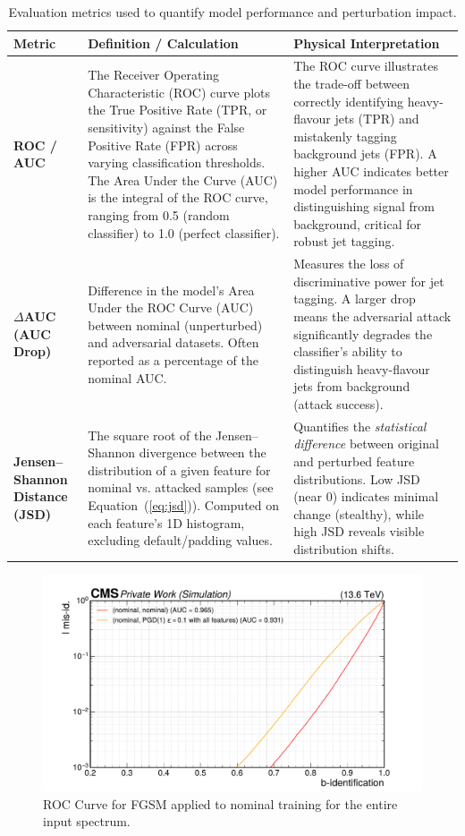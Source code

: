\documentclass[12pt]{caltech_thesis}
\begin{document}
\begin{table}[ht]
\centering
\caption{Evaluation metrics used to quantify model performance and perturbation impact.}
\begin{tabularx}{\textwidth}{@{} l X X @{}}
\toprule
\textbf{Metric} & \textbf{Definition / Calculation} & \textbf{Physical Interpretation} \\
\midrule
\textbf{ROC / AUC} &
The Receiver Operating Characteristic (ROC) curve plots the True Positive Rate (TPR, or sensitivity) against the False Positive Rate (FPR) across varying classification thresholds. The Area Under the Curve (AUC) is the integral of the ROC curve, ranging from 0.5 (random classifier) to 1.0 (perfect classifier). &
The ROC curve illustrates the trade-off between correctly identifying heavy-flavour jets (TPR) and mistakenly tagging background jets (FPR). A higher AUC indicates better model performance in distinguishing signal from background, critical for robust jet tagging. \\
\addlinespace
\textbf{\(\Delta\)AUC (AUC Drop)} &
Difference in the model’s Area Under the ROC Curve (AUC) between nominal (unperturbed) and adversarial datasets. Often reported as a percentage of the nominal AUC. &
Measures the loss of discriminative power for jet tagging. A larger drop means the adversarial attack significantly degrades the classifier’s ability to distinguish heavy-flavour jets from background (attack success). \\
\addlinespace
\textbf{Jensen–Shannon Distance (JSD)} &
The square root of the Jensen–Shannon divergence between the distribution of a given feature for nominal vs. attacked samples (see Equation~(\ref{eq:jsd})). Computed on each feature’s 1D histogram, excluding default/padding values. &
Quantifies the \emph{statistical difference} between original and perturbed feature distributions. Low JSD (near 0) indicates minimal change (stealthy), while high JSD reveals visible distribution shifts. \\
\hline
\end{tabularx}
\label{tab:evaluation_metrics}
\end{table}

\begin{figure}[h]
\centering
    \includegraphics[width=13cm]{media/output/roc_bvsl_intpgd_failure.pdf}
    \caption{ROC Curve for FGSM applied to nominal training for the entire input spectrum.}
    \label{fig:intpgd_roc}
\end{figure}
\end{document}

